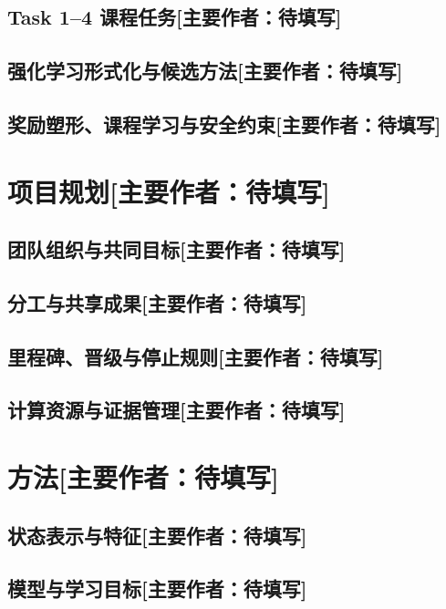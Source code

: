\documentclass[UTF8,11pt,a4paper,fontset=none]{ctexart}
\newcommand{\primaryauthor}[1]{\texorpdfstring{\enspace\normalfont\small[主要作者：#1]}{ [主要作者：#1]}}
\newcommand{\authorsection}[2]{\section{#1\primaryauthor{#2}}}
\newcommand{\authorsubsection}[2]{\subsection{#1\primaryauthor{#2}}}
\newcommand{\pendingauthor}{待填写}
\newif\ifdraftguidance
\newcommand{\writingnote}[1]{%
  \ifdraftguidance
    \par\noindent\begingroup\color{promptblue}\small
    \fbox{\begin{minipage}{0.94\linewidth}\textbf{写作提示：}#1\end{minipage}}%
    \par\endgroup
  \fi
}
\newcommand{\todoitem}[1]{%
  \ifdraftguidance\textcolor{promptblue}{\textbf{[待补：#1]}}\fi
}
\begin{document}
\authorsubsection{Task 1--4 课程任务}{\pendingauthor}
\writingnote{解释从金币导航、炸箱逃生、弱对手到强对手的难度递进，以及每阶段测试的能力。区分课程建议和团队自定门槛。}
\todoitem{正文}

\authorsubsection{强化学习形式化与候选方法}{\pendingauthor}
\writingnote{定义状态、动作、奖励、策略和价值函数；概述实际考虑的 Q-learning、DQN、Double DQN、n-step、PER、蒸馏或其他方法。只写与项目决策相关的理论。}
\todoitem{正文与必要公式}

\authorsubsection{奖励塑形、课程学习与安全约束}{\pendingauthor}
\writingnote{说明这些概念为什么适合本任务、可能引入什么偏差，以及之后将如何用消融或冻结评估验证。}
\todoitem{正文}

\authorsection{项目规划}{\pendingauthor}
\writingnote{说明真实的团队组织、时间规划、子任务分配和协作方式。不能把项目描述成成员各自独立完成一个模型；应展示共同设计、评审、工具或实验决策。}

\authorsubsection{团队组织与共同目标}{\pendingauthor}
\writingnote{说明成员角色、共同会议/评审方式、共享代码和实验协议，以及关键决定如何形成。}
\todoitem{正文}

\authorsubsection{分工与共享成果}{\pendingauthor}
\writingnote{用表格列责任人、工作包、协作者、输出和证据路径。明确哪些特征、奖励、安全层或评估工具被多条模型路线共同使用。}
\todoitem{正文或分工表}

\authorsubsection{里程碑、晋级与停止规则}{\pendingauthor}
\writingnote{给出真实时间线和 Task 1--4 的进入/退出条件。停止某条路线时写清门槛、证据、资源权衡与信息增益，不要只说“效果不好”。}
\todoitem{正文或时间线}

\authorsubsection{计算资源与证据管理}{\pendingauthor}
\writingnote{记录训练硬件、预算、随机种子、checkpoint、run ID、逐局输出、证据状态和复现路径。使用深度学习时必须说明训练硬件资源。}
\todoitem{正文}

\authorsection{方法}{\pendingauthor}
\writingnote{解释并论证关键设计选择、待比较变体、性能指标和系统测试方法，并引用相关文献。方法章写“怎么做、为什么”，结果章写“发生了什么”。}

\authorsubsection{状态表示与特征}{\pendingauthor}
\writingnote{逐模型说明输入形状、归一化、历史信息、空间通道或离散编码。解释每组特征对应的失败假设，避免把版本号直接当成性能顺序。}
\todoitem{正文与特征表}

\authorsubsection{模型与学习目标}{\pendingauthor}
\writingnote{团队必须开发并比较至少两个不同模型。对每个模型说明结构、输出、损失/更新公式、目标网络或估计器、关键超参数、相对基线的变化和预期风险。}
\todoitem{正文、公式与架构图}
\end{document}
